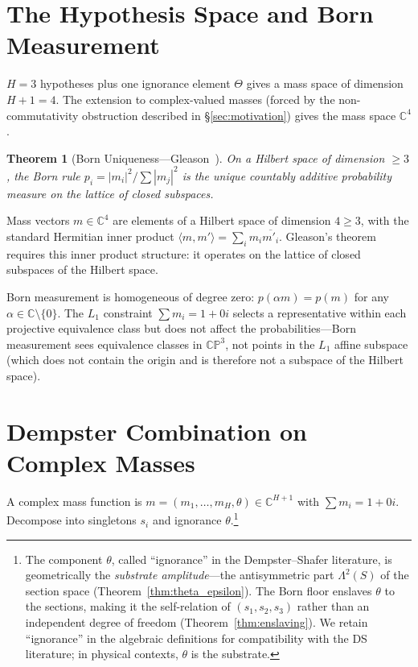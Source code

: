 \documentclass[11pt,a4paper]{article}
\newtheorem{theorem}{Theorem}[section]
\theoremstyle{definition}
\theoremstyle{remark}
\newcommand{\CP}{\mathbb{CP}}
\newcommand{\C}{\mathbb{C}}
\begin{document}
\section{The Hypothesis Space and Born Measurement}\label{sec:hilbert}

$H=3$ hypotheses plus one ignorance element $\Theta$ gives a mass space of dimension $H+1=4$. The extension to complex-valued masses (forced by the non-commutativity obstruction described in \S\ref{sec:motivation}) gives the mass space $\C^4$.

\begin{theorem}[Born Uniqueness---Gleason~\cite{Gleason1957}]\label{thm:gleason}
On a Hilbert space of dimension $\geq 3$, the Born rule $p_i=|m_i|^2/\sum|m_j|^2$ is the unique countably additive probability measure on the lattice of closed subspaces.
\end{theorem}

Mass vectors $m\in\C^4$ are elements of a Hilbert space of dimension $4\geq 3$, with the standard Hermitian inner product $\langle m,m'\rangle=\sum_i m_i\overline{m'_i}$. Gleason's theorem requires this inner product structure: it operates on the lattice of closed subspaces of the Hilbert space.

Born measurement is homogeneous of degree zero: $p(\alpha m)=p(m)$ for any $\alpha\in\C\setminus\{0\}$. The $L_1$ constraint $\sum m_i=1+0i$ selects a representative within each projective equivalence class but does not affect the probabilities---Born measurement sees equivalence classes in $\CP^3$, not points in the $L_1$ affine subspace (which does not contain the origin and is therefore not a subspace of the Hilbert space).


\section{Dempster Combination on Complex Masses}\label{sec:dempster}

A complex mass function is $m=(m_1,\ldots,m_H,\theta)\in\C^{H+1}$ with $\sum m_i=1+0i$. Decompose into singletons $s_i$ and ignorance $\theta$.\footnote{The component $\theta$, called ``ignorance'' in the Dempster--Shafer literature, is geometrically the \emph{substrate amplitude}---the antisymmetric part $\Lambda^2(S)$ of the section space (Theorem~\ref{thm:theta_epsilon}). The Born floor enslaves $\theta$ to the sections, making it the self-relation of $(s_1,s_2,s_3)$ rather than an independent degree of freedom (Theorem~\ref{thm:enslaving}). We retain ``ignorance'' in the algebraic definitions for compatibility with the DS literature; in physical contexts, $\theta$ is the substrate.}
\end{document}
